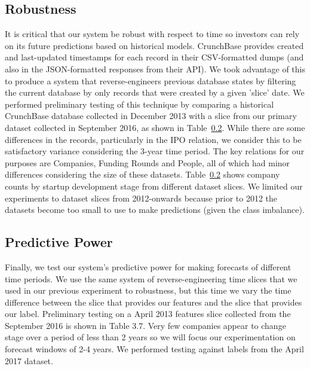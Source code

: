 \documentclass[../thesis/thesis.tex]{subfiles}
\begin{document}
\subsection{Robustness}

It is critical that our system be robust with respect to time so investors can rely on its future predictions based on historical models. CrunchBase provides created and last-updated timestamps for each record in their CSV-formatted dumps (and also in the JSON-formatted responses from their API). We took advantage of this to produce a system that  reverse-engineers previous database states by filtering the current database by only records that were created by a given 'slice' date. We performed preliminary testing of this technique by comparing a historical CrunchBase database collected in December 2013 with a slice from our primary dataset collected in September 2016, as shown in Table~\ref{}. While there are some differences in the records, particularly in the IPO relation, we consider this to be satisfactory variance considering the 3-year time period. The key relations for our purposes are Companies, Funding Rounds and People, all of which had minor differences considering the size of these datasets. Table~\ref{} shows company counts by startup development stage from different dataset slices. We limited our experiments to dataset slices from 2012-onwards because prior to 2012 the datasets become too small to use to make predictions (given the class imbalance).




\subsection{Predictive Power}

Finally, we test our system's predictive power for making forecasts of different time periods. We use the same system of reverse-engineering time slices that we used in our previous experiment to robustness, but this time we vary the time difference between the slice that provides our features and the slice that provides our label. Preliminary testing on a April 2013 features slice collected from the September 2016 is shown in Table 3.7. Very few companies appear to change stage over a period of less than 2 years so we will focus our experimentation on forecast windows of 2-4 years. We performed testing against labels from the April 2017 dataset.




\end{document}

